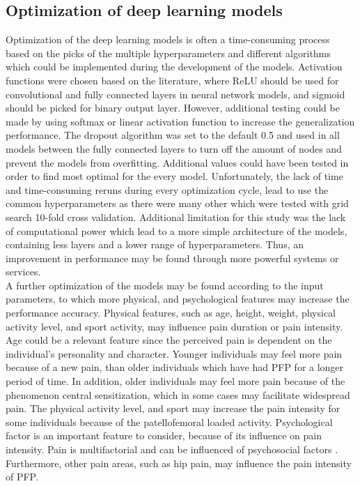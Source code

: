 \subsection{Optimization of deep learning models}
Optimization of the deep learning models is often a time-consuming process based on the picks of the multiple hyperparameters and different algorithms which could be implemented during the development of the models.
Activation functions were chosen based on the literature, where ReLU should be used for convolutional and fully connected layers in neural network models, and sigmoid should be picked for binary output layer. However, additional testing could be made by using softmax or linear activation function to increase the generalization performance. The dropout algorithm was set to the default 0.5 and used in all models between the fully connected layers to turn off the amount of nodes and prevent the models from overfitting. Additional values could have been tested in order to find most optimal for the every model.
Unfortunately, the lack of time and time-consuming reruns during every optimization cycle, lead to use the common hyperparameters as there were many other which were tested with grid search 10-fold cross validation.
\noindent
Additional limitation for this study was the lack of computational power which lead to a more simple architecture of the models, containing less layers and a lower range of hyperparameters. Thus, an improvement in performance may be found through more powerful systems or services. \\
\noindent
A further optimization of the models may be found according to the input parameters, to which more physical, and psychological features may increase the performance accuracy. Physical features, such as age, height, weight, physical activity level, and sport activity, may influence pain duration or pain intensity. Age could be a relevant feature since the perceived pain is dependent on the individual's personality and character. Younger individuals may feel more pain because of a new pain, than older individuals which have had PFP for a longer period of time. In addition, older individuals may feel more pain because of the phenomenon central sensitization, which in some cases may facilitate widespread pain. The physical activity level, and sport may increase the pain intensity for some individuals because of the patellofemoral loaded activity. Psychological factor is an important feature to consider, because of its influence on pain intensity. Pain is multifactorial and can be influenced of psychosocial factors \citep{Roos2003}. Furthermore, other pain areas, such as hip pain, may influence the pain intensity of PFP.



